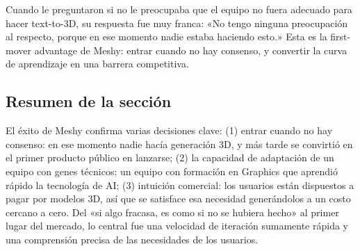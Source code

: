 Cuando le preguntaron si no le preocupaba que el equipo no fuera adecuado para hacer text-to-3D, su respuesta fue muy franca: «No tengo ninguna preocupación al respecto, porque en ese momento nadie estaba haciendo esto.» Esta es la first-mover advantage de Meshy: entrar cuando no hay consenso, y convertir la curva de aprendizaje en una barrera competitiva.

\subsection{Resumen de la sección}

El éxito de Meshy confirma varias decisiones clave: (1) entrar cuando no hay consenso: en ese momento nadie hacía generación 3D, y más tarde se convirtió en el primer producto público en lanzarse; (2) la capacidad de adaptación de un equipo con genes técnicos: un equipo con formación en Graphics que aprendió rápido la tecnología de AI; (3) intuición comercial: los usuarios están dispuestos a pagar por modelos 3D, así que se satisface esa necesidad generándolos a un costo cercano a cero. Del «si algo fracasa, es como si no se hubiera hecho» al primer lugar del mercado, lo central fue una velocidad de iteración sumamente rápida y una comprensión precisa de las necesidades de los usuarios.
